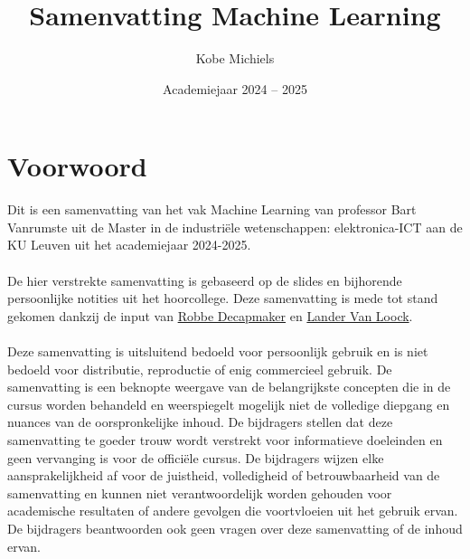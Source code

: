 \documentclass[kul]{kulakarticle} %
\title{Samenvatting Machine Learning}
\author{Kobe Michiels}
\date{Academiejaar 2024 -- 2025}
\begin{document}
	
	\maketitle
	
	\section*{Voorwoord}
	
	Dit is een samenvatting van het vak Machine Learning van professor Bart Vanrumste uit de Master in de industriële wetenschappen: elektronica-ICT aan de KU Leuven uit het academiejaar 2024-2025.  
	\\\\
	De hier verstrekte samenvatting is gebaseerd op de slides en bijhorende persoonlijke notities uit het hoorcollege. Deze samenvatting is mede tot stand gekomen dankzij de input van \href{https://github.com/debber1}{Robbe Decapmaker} en \href{https://github.com/Lander0606}{Lander Van Loock}.
	\\\\
	Deze samenvatting is uitsluitend bedoeld voor persoonlijk gebruik en is niet bedoeld voor distributie, reproductie of enig commercieel gebruik. De samenvatting is een beknopte weergave van de belangrijkste concepten die in de cursus worden behandeld en weerspiegelt mogelijk niet de volledige diepgang en nuances van de oorspronkelijke inhoud. De bijdragers stellen dat deze samenvatting te goeder trouw wordt verstrekt voor informatieve doeleinden en geen vervanging is voor de officiële cursus. De bijdragers wijzen elke aansprakelijkheid af voor de juistheid, volledigheid of betrouwbaarheid van de samenvatting en kunnen niet verantwoordelijk worden gehouden voor academische resultaten of andere gevolgen die voortvloeien uit het gebruik ervan. De bijdragers beantwoorden ook geen vragen over deze samenvatting of de inhoud ervan.
	
	\setcounter{tocdepth}{2}
	\tableofcontents
	
		\newpage
		
		
		
		
		
		
		
		
\end{document}
